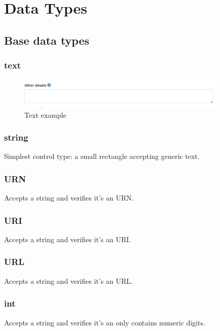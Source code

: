 \documentclass[10pt]{article}
\begin{document}
\section{Data Types} 
\label{datatypes}

\subsection{Base data types}
\label{base-types}

\subsubsection{text}
\label{text}

\begin{figure}[h]
	\caption{Text example}
	\includegraphics[width=10cm]{Textarea.png}
	\centering
\end{figure}

\subsubsection{string}
\label{string}

Simplest control type: a small rectangle accepting generic text.

\subsubsection{URN}
\label{URN}

Accepts a string and verifies it's an URN.

\subsubsection{URI}
\label{URI}

Accepts a string and verifies it's an URI.

\subsubsection{URL}
\label{URL}
Accepts a string and verifies it's an URL.

\subsubsection{int}
\label{int}
Accepts a string and verifies it's an only contains numeric digits.
\end{document}
